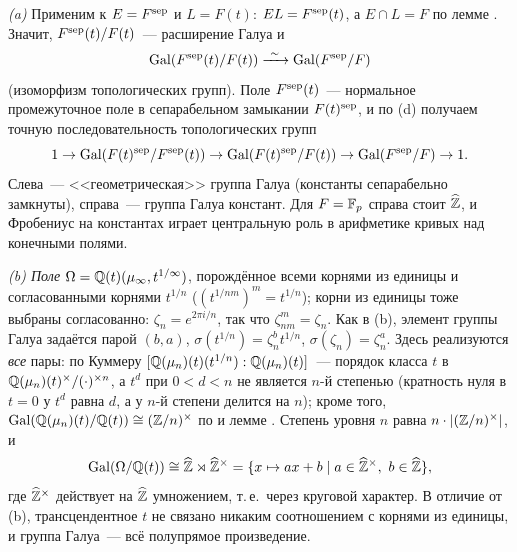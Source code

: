 \begin{example}[7.38]
\emph{(a)} Применим  к $E=F^{\mathrm{sep}}$ и $L=F(t)$: $EL=F^{\mathrm{sep}}(t)$, а $E\cap L=F$ по лемме . Значит, $F^{\mathrm{sep}}(t)/F(t)$~---
расширение Галуа и
\[
\Gal(\Fsep(t)/F(t))\xrightarrow{\ \sim\ }\Gal(\Fsep/F)
\]
(изоморфизм топологических групп). Поле $F^{\mathrm{sep}}(t)$~--- нормальное промежуточное поле в сепарабельном замыкании
$F(t)^{\rm sep}$, и по (d) получаем точную последовательность топологических групп
\[
1\to\operatorname{Gal}(F(t)^{\rm sep}/F^{\mathrm{sep}}(t))\to\operatorname{Gal}(F(t)^{\rm sep}/F(t))\to\operatorname{Gal}(F^{\mathrm{sep}}/F)\to1.
\]
Слева~--- <<геометрическая>> группа Галуа (константы сепарабельно замкнуты), справа~--- группа Галуа констант. Для
$F=\mathbb F_p$ справа стоит $\widehat{\mathbb Z}$, и Фробениус на константах играет центральную роль в арифметике кривых над конечными полями.

\begin{center}
\end{center}

\emph{(b) Поле $\Omega=\mathbb Q(t)(\mu_\infty,t^{1/\infty})$}, порождённое всеми корнями из единицы и согласованными корнями
$t^{1/n}$ ($(t^{1/nm})^m=t^{1/n}$); корни из единицы тоже выбраны согласованно: $\zeta_n=e^{2\pi i/n}$, так что
$\zeta_{nm}^m=\zeta_n$. Как в (b), элемент группы Галуа задаётся парой $(b,a)$, $\sigma(t^{1/n})=
\zeta_n^bt^{1/n}$, $\sigma(\zeta_n)=\zeta_n^a$. Здесь реализуются \emph{все} пары: по Куммеру
$[\mathbb Q(\mu_n)(t)(t^{1/n}):\mathbb Q(\mu_n)(t)]$~--- порядок класса $t$ в $\mathbb Q(\mu_n)(t)^\times/(\cdot)^{\times n}$, а $t^d$ при
$0<d<n$ не является $n$-й степенью (кратность нуля в $t=0$ у $t^d$ равна $d$, а у $n$-й степени делится на $n$); кроме того,
$\operatorname{Gal}(\mathbb Q(\mu_n)(t)/\mathbb Q(t))\cong(\mathbb Z/n)^\times$ по  и лемме . Степень уровня $n$ равна $n\cdot|(\mathbb Z/n)^\times|$, и
\[
\operatorname{Gal}(\Omega/\mathbb Q(t))\cong\widehat{\mathbb Z}\rtimes\widehat{\mathbb Z}^\times=\{x\mapsto ax+b\mid a\in\widehat{\mathbb Z}^\times,\ b\in\widehat{\mathbb Z}\},
\]
где $\widehat{\mathbb Z}^\times$ действует на $\widehat{\mathbb Z}$ умножением, т.\,е.\ через круговой характер. В отличие от (b), трансцендентное $t$
не связано никаким соотношением с корнями из единицы, и группа Галуа~--- всё полупрямое произведение.
\end{example}

